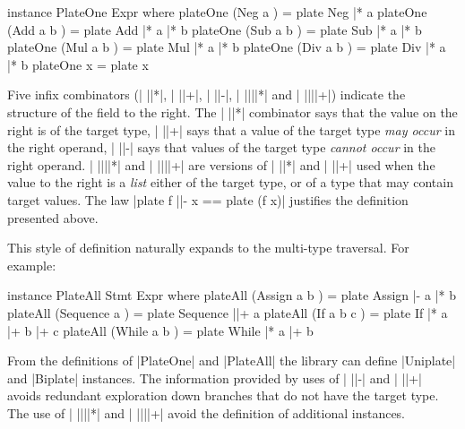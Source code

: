 \begin{comment}
\begin{code}
class PlateAll from to where
    plateAll :: from -> Type from to
class PlateOne to where
    plateOne :: to -> Type to to
type Type from to = (Str to, Str to -> from)
plate :: from -> Type from to
(|*) :: Type (to -> from) to -> to -> Type from to
(|+) :: PlateAll item to => Type (item -> from) to -> item -> Type from to
(|-) :: Type (item -> from) to -> item -> Type from to
(||*) :: Type ([to] -> from) to -> [to] -> Type from to
(||+) :: PlateAll item to => Type ([item] -> from) to -> [item] -> Type from to
\end{code}
\end{comment}

\begin{code}
instance PlateOne Expr where
    plateOne (Neg  a    )  = plate Neg  |* a
    plateOne (Add  a b  )  = plate Add  |* a |* b
    plateOne (Sub  a b  )  = plate Sub  |* a |* b
    plateOne (Mul  a b  )  = plate Mul  |* a |* b
    plateOne (Div  a b  )  = plate Div  |* a |* b
    plateOne x             = plate x
\end{code}

Five infix combinators (| ||*|, | ||+|, | ||-|, | ||||*| and | ||||+|) indicate the structure of the field to the right. The | ||*| combinator says that the value on the right is of the target type, | ||+| says that a value of the target type \textit{may occur} in the right operand, | ||-| says that values of the target type \textit{cannot occur} in the right operand. | ||||*| and | ||||+| are versions of | ||*| and | ||+| used when the value to the right is a \textit{list} either of the target type, or of a type that may contain target values. The law |plate f ||- x == plate (f x)| justifies the definition presented above.

This style of definition naturally expands to the multi-type traversal. For example:

\begin{onepage}
\begin{code}
instance PlateAll Stmt Expr where
    plateAll (Assign    a b    ) = plate Assign    |-   a |*  b
    plateAll (Sequence  a      ) = plate Sequence  ||+  a
    plateAll (If        a b c  ) = plate If        |*   a |+  b |+ c
    plateAll (While     a b    ) = plate While     |*   a |+  b
\end{code}
\end{onepage}

From the definitions of |PlateOne| and |PlateAll| the library can define |Uniplate| and |Biplate| instances. The information provided by uses of | ||-| and | ||+| avoids redundant exploration down branches that do not have the target type. The use of | ||||*| and | ||||+| avoid the definition of additional instances.

